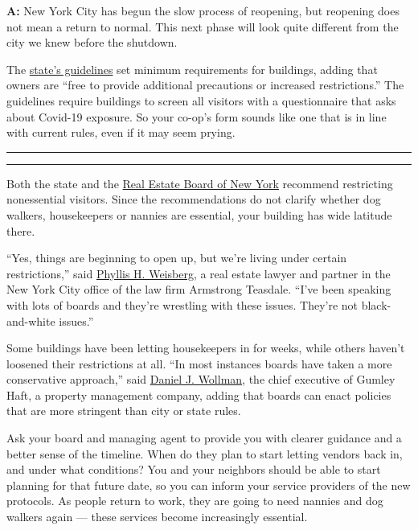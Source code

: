 \textbf{A:} New York City has begun the slow process of reopening, but
reopening does not mean a return to normal. This next phase will look
quite different from the city we knew before the shutdown.

The
\href{https://www.governor.ny.gov/sites/governor.ny.gov/files/atoms/files/realestate-masterguidance.pdf}{state's
guidelines} set minimum requirements for buildings, adding that owners
are ``free to provide additional precautions or increased
restrictions.'' The guidelines require buildings to screen all visitors
with a questionnaire that asks about Covid-19 exposure. So your co-op's
form sounds like one that is in line with current rules, even if it may
seem prying.

\begin{center}\rule{0.5\linewidth}{\linethickness}\end{center}

\begin{center}\rule{0.5\linewidth}{\linethickness}\end{center}

Both the state and the
\href{https://rebny.com/content/dam/rebny/Documents/PDF/Resources/CoronavirusResources/Guidelines_Residential\%20Buildings_FINAL.pdf}{Real
Estate Board of New York} recommend restricting nonessential visitors.
Since the recommendations do not clarify whether dog walkers,
housekeepers or nannies are essential, your building has wide latitude
there.

``Yes, things are beginning to open up, but we're living under certain
restrictions,'' said
\href{https://www.armstrongteasdale.com/phyllis-weisberg/}{Phyllis H.
Weisberg}, a real estate lawyer and partner in the New York City office
of the law firm Armstrong Teasdale. ``I've been speaking with lots of
boards and they're wrestling with these issues. They're not
black-and-white issues.''

Some buildings have been letting housekeepers in for weeks, while others
haven't loosened their restrictions at all. ``In most instances boards
have taken a more conservative approach,'' said
\href{https://gumleyhaft.com/about-gumley-haft/daniel-j-wollman-leads-gumleyhaft-property-management-nyc/}{Daniel
J. Wollman}, the chief executive of Gumley Haft, a property management
company, adding that boards can enact policies that are more stringent
than city or state rules.

Ask your board and managing agent to provide you with clearer guidance
and a better sense of the timeline. When do they plan to start letting
vendors back in, and under what conditions? You and your neighbors
should be able to start planning for that future date, so you can inform
your service providers of the new protocols. As people return to work,
they are going to need nannies and dog walkers again --- these services
become increasingly essential.

